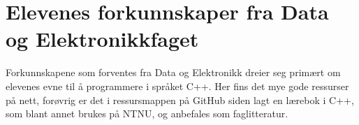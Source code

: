 \section*{Elevenes forkunnskaper fra Data og Elektronikkfaget} \label{Sec: KoordDataEl}

    Forkunnskapene som forventes fra Data og Elektronikk dreier seg primært om elevenes evne til å programmere i språket C++.
    Her fins det mye gode ressurser på nett, forøvrig er det i ressursmappen på GitHub siden lagt en lærebok i C++, som blant annet brukes på NTNU, og anbefales som faglitteratur.

